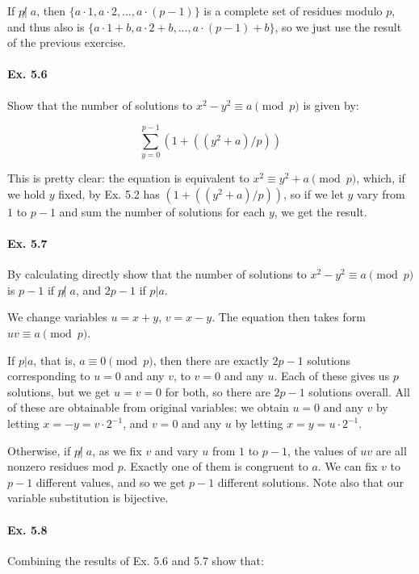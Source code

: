 \documentclass[notitlepage]{article}
\theoremstyle{definition}
\begin{document}
If $p \not | \; a$, then $\{a \cdot 1, a\cdot 2, \ldots, a \cdot (p-1)\}$ is a
complete set of residues modulo $p$, and thus also is $\{a \cdot 1+b, a\cdot 2
+b, \ldots, a \cdot (p-1) +b\}$, so we just use the result of the
previous exercise.

\paragraph{Ex. 5.6}
Show that the number of solutions to $x^2 - y^2 \equiv a \pmod p$ is given by:

\begin{equation}
  \sum_{y=0}^{p-1}(1+((y^2 + a)/p))
\end{equation}

This is pretty clear: the equation is equivalent to $x^2 \equiv y^2 +
a \pmod p$, which, if we hold $y$ fixed, by Ex. 5.2 has $(1+((y^2 +
a)/p))$, so if we let $y$ vary from $1$ to $p-1$ and sum the number of
solutions for each $y$, we get the result.

\paragraph{Ex. 5.7}
By calculating directly show that the number of solutions to $x^2 -
y^2 \equiv a \pmod p$ is $p-1$ if $p \not | \; a$, and $2p - 1$ if $p
| a$.

We change variables $u = x+y$, $v = x-y$. The equation then takes form
$uv \equiv a \pmod p$.

If $p | a$, that is, $a \equiv 0 \pmod p$, then there are exactly $2p -
1$ solutions corresponding to $u = 0$ and any $v$, to $v = 0$ and any
$u$. Each of these gives us $p$ solutions, but we get $u = v = 0$ for
both, so there are $2p - 1$ solutions overall. All of these are
obtainable from original variables: we obtain $u = 0$ and any $v$ by
letting $x = -y = v \cdot 2^{-1}$, and $v = 0$ and any $u$ by letting
$x = y = u \cdot 2^{-1}$.

Otherwise, if $p \not | \; a$, as we fix $v$ and vary $u$ from $1$ to
$p-1$, the values of $uv$ are all nonzero residues mod $p$. Exactly
one of them is congruent to $a$. We can fix $v$ to $p-1$ different
values, and so we get $p-1$ different solutions. Note also that our
variable substitution is bijective.

\paragraph{Ex. 5.8}
Combining the results of Ex. 5.6 and 5.7 show that:
\end{document}
